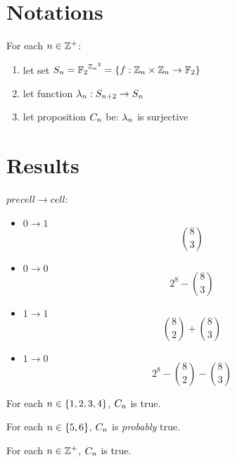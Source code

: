 \documentclass{paper}
\begin{document}

\begin{center}
\Large{\mytitle}
\end{center}

\tableofcontents

\begin{flushleft}


\section{Notations}

For each $n \in \mathbb{Z}^+$:
\begin{enumerate}
\item let set $S_{n} = {\mathbb{F}_2}^{{\mathbb{Z}_n}^2} =
  \{f: \mathbb{Z}_n \times \mathbb{Z}_n \to \mathbb{F}_2\}$
\item let function $\lambda_{n}: S_{n+2} \to S_{n}$
\item let proposition $C_{n}$ be: $\lambda_{n}$ is surjective
\end{enumerate}


\section{Results}

\begin{remark}
$precell \to cell$:
\begin{itemize}
\item $0 \to 1$ $$\binom{8}{3}$$
\item $0 \to 0$ $$2^8 - \binom{8}{3}$$
\item $1 \to 1$ $$\binom{8}{2} + \binom{8}{3}$$
\item $1 \to 0$ $$2^8 - \binom{8}{2} - \binom{8}{3}$$
\end{itemize}
\end{remark}

\begin{remark}
For each $n \in \{1, 2, 3, 4\}$, $C_{n}$ is true.
\end{remark}

\begin{remark}
For each $n \in \{5, 6\}$, $C_{n}$ is
\emph{probably} true.
\end{remark}

\begin{conjecture}
For each $n \in \mathbb{Z}^+$, $C_{n}$ is true.
\end{conjecture}


\end{flushleft}
\end{document}
